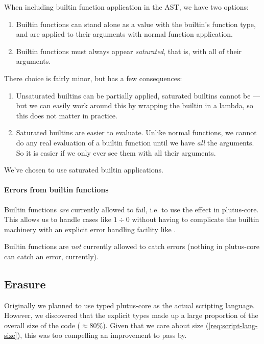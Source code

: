 When including builtin function application in the AST, we have two options:
\begin{enumerate}
\item
  Builtin functions can stand alone as a value with the builtin's function type, and are applied to their arguments with normal function application.
\item
  Builtin functions must always appear \emph{saturated}, that is, with all of their arguments.
\end{enumerate}

There choice is fairly minor, but has a few consequences:
\begin{enumerate}
\item
  Unsaturated builtins can be partially applied, saturated builtins cannot be --- but we can easily work around this by wrapping the builtin in a lambda, so this does not matter in practice.
\item
  Saturated builtins are easier to evaluate.
  Unlike normal functions, we cannot do any real evaluation of a builtin function until we have \emph{all} the arguments.
  So it is easier if we only ever see them with all their arguments.
\end{enumerate}

We've chosen to use saturated builtin applications.

\paragraph{Errors from builtin functions}

Builtin functions \emph{are} currently allowed to fail, i.e. to use the  effect in \gls{plutus-core}.
This allows us to handle cases like $1 \div 0$ without having to complicate the builtin machinery with an explicit error handling facility like .

Builtin functions are \emph{not} currently allowed to catch errors (nothing in \gls{plutus-core} can catch an error, currently).

\subsection{Erasure}
\label{sec:erasure}

Originally we planned to use typed \gls{plutus-core} as the actual scripting language.
However, we discovered that the explicit types made up a large proportion of the overall size of the code ($\approx 80\%$).
Given that we care about size (\cref{req:script-lang-size}), this was too compelling an improvement to pass by.


